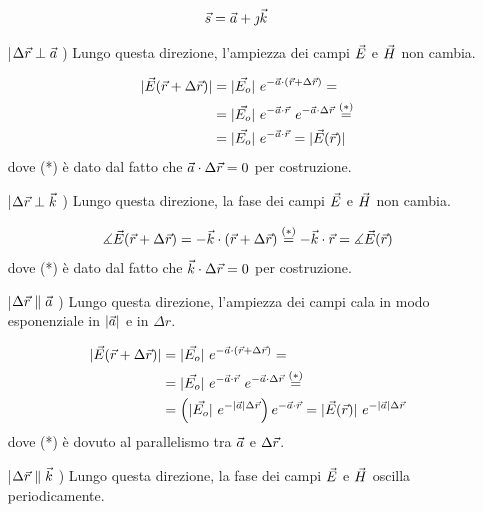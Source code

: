 	\begin{equation*}
		\vec{s} = \vec{a} + \jmath \vec{k}
	\end{equation*}

	\begin{itemize}
		\item[|$\Delta\vec{r} \perp \vec{a}$ )] Lungo questa direzione, l'ampiezza dei campi $\vec{E}$ e $\vec{H}$ non cambia.

		\begin{equation*}
			\begin{split}
				|\vec{E}(\vec{r} + \Delta\vec{r})| &= |\vec{E_o}| ~ e^{-\vec{a} \cdot (\vec{r} + \Delta\vec{r})} = \\
				& = |\vec{E_o}| ~ e^{-\vec{a} \cdot \vec{r}} ~ e^{-\vec{a} \cdot \Delta\vec{r}} \stackrel{(*)}{=} \\
				& = |\vec{E_o}| ~ e^{-\vec{a} \cdot \vec{r}} = |\vec{E}(\vec{r})|
			\end{split}
		\end{equation*}
		dove (*) è dato dal fatto che $\vec{a} \cdot \Delta\vec{r} = 0$ per costruzione.

		\item[|$\Delta\vec{r} \perp \vec{k}$ )] Lungo questa direzione, la fase dei campi $\vec{E}$ e $\vec{H}$ non cambia.

		\begin{equation*}
				\measuredangle \vec{E}(\vec{r} + \Delta\vec{r}) = -\vec{k} \cdot (\vec{r} + \Delta\vec{r}) \stackrel{(*)}{=} - \vec{k} \cdot \vec{r} = \measuredangle \vec{E}(\vec{r})
		\end{equation*}
		dove (*) è dato dal fatto che $\vec{k} \cdot \Delta\vec{r} = 0$ per costruzione.

		\item[|$\Delta\vec{r} \parallel \vec{a}$ )] Lungo questa direzione, l'ampiezza dei campi cala in modo esponenziale in $|\vec{a}|$ e in $\Delta r$.

		\begin{equation*}
			\begin{split}
				|\vec{E}(\vec{r} + \Delta\vec{r})| &= |\vec{E_o}| ~ e^{-\vec{a} \cdot (\vec{r} + \Delta\vec{r})} = \\
				& = |\vec{E_o}| ~ e^{-\vec{a} \cdot \vec{r}} ~ e^{-\vec{a} \cdot \Delta\vec{r}} \stackrel{(*)}{=} \\
				& = \left( |\vec{E_o}| ~ e^{-|\vec{a}| \Delta\vec{r}} \right) e^{-\vec{a} \cdot \vec{r}} = |\vec{E}(\vec{r})| ~ e^{-|\vec{a}| \Delta\vec{r}}
			\end{split}
		\end{equation*}
		dove (*) è dovuto al parallelismo tra $\vec{a}$ e $\Delta\vec{r}$.

		\item[|$\Delta\vec{r} \parallel \vec{k}$ )] Lungo questa direzione, la fase dei campi $\vec{E}$ e $\vec{H}$ oscilla periodicamente.


\end{itemize}
